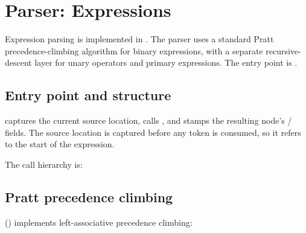 \chapter{Parser: Expressions}
\label{chap:07-parser-expressions}

\pnum
Expression parsing is implemented in .  The parser
uses a standard Pratt precedence-climbing algorithm for binary expressions,
with a separate recursive-descent layer for unary operators and primary
expressions.  The entry point is .

\section{Entry point and structure}
\label{sec:par-expr-entry}

\pnum
{} captures the current source location, calls
, and stamps the resulting node's
/ fields.  The source location is captured before any
token is consumed, so it refers to the start of the expression.

\pnum
The call hierarchy is:

\begin{center}
\end{center}

\section{Pratt precedence climbing}
\label{sec:par-expr-pratt}

\pnum
{}
() implements left-associative precedence climbing:

